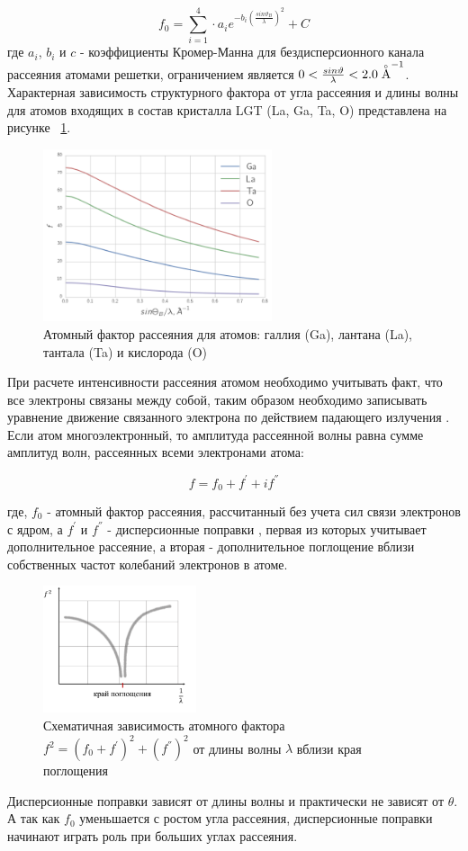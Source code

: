 \begin{equation}
  f_0 = \sum_{i=1}^{4} \cdot a_i e^{ -b_i (\frac{sin \vartheta_B}{\lambda})^2} + C
 \end{equation}
где $a_i$, $b_i$ и $c$ - коэффициенты Кромер-Манна для бездисперсионного канала рассеяния атомами решетки,
ограничением является $0<\frac{sin\vartheta}{\lambda}<2.0 \angstrom ^{-1}$.
 Характерная зависимость структурного фактора от угла рассеяния и длины волны
для атомов входящих в состав кристалла LGT (La, Ga, Ta, O) представлена на рисунке ~\ref{ris:atom_factor_GaLaTa}.

\begin{figure}[H]
  \centering
  \includegraphics[width=0.6\textwidth]{images/atom_factor_GaLaTa.png}
  \caption{ Атомный фактор рассеяния для атомов: галлия (Ga), лантана (La), тантала (Ta) и  кислорода (O)}
  \label{ris:atom_factor_GaLaTa}
\end{figure}

При расчете интенсивности рассеяния атомом необходимо учитывать факт,
что все электроны связаны между собой, таким образом необходимо записывать
уравнение движение связанного электрона по действием падающего излучения \cite{iveronova1972}.
Если атом многоэлектронный, то амплитуда рассеянной волны равна сумме амплитуд волн,
рассеянных всеми электронами атома:

\begin{equation}
  f = f_0 + f^{'} + i f^{''}
 \end{equation}

 где, $f_0$ - атомный фактор рассеяния, рассчитанный без учета сил связи электронов
 с ядром, а $f^{'}$ и $f^{''}$ - дисперсионные поправки \cite{f0f1f12},
 первая из которых учитывает дополнительное рассеяние,
а вторая - дополнительное поглощение вблизи собственных частот колебаний электронов в атоме.

 \begin{figure}[H]
   \centering
   \includegraphics[width=0.4\textwidth]{images/dispers_f.png}
   \caption{ Схематичная зависимость атомного фактора $f^2 = (f_0 + f^{'})^2 + (f^{''})^2 $ от
   длины волны $\lambda$ вблизи края поглощения}
   \label{ris:dispers_f}
 \end{figure}

Дисперсионные поправки зависят от длины волны и практически не зависят
от $\theta$. А так как $f_0$ уменьшается с ростом угла рассеяния,
 дисперсионные поправки начинают играть роль при больших углах рассеяния.
